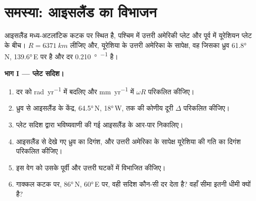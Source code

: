 \section{समस्या: आइसलैंड का विभाजन}

\begin{problem}
\label{pb:b1:plate-kinematics:1}
आइसलैंड मध्य-अटलांटिक कटक पर स्थित है, पश्चिम में उत्तरी अमेरिकी प्लेट और पूर्व में यूरेशियन प्लेट के बीच। $R = \qty{6371}{km}$ लीजिए और, यूरेशिया के उत्तरी अमेरिका के सापेक्ष, वह  जिसका ध्रुव \ang{61.8}\,N, \ang{139.6}\,E पर है और दर \qty{0.210}{\degree\per\Myr} है।

\medskip
\noindent\textbf{भाग I --- प्लेट सदिश।}
\begin{enumerate}
  \item दर को \unit{rad.yr^{-1}} में बदलिए और \unit{mm.yr^{-1}} में $\omega R$ परिकलित कीजिए।
  \item ध्रुव से आइसलैंड के केंद्र, \ang{64.5}\,N, \ang{18}\,W, तक की कोणीय दूरी $\Delta$ परिकलित कीजिए।
  \item प्लेट सदिश द्वारा भविष्यवाणी की गई आइसलैंड के आर-पार  निकालिए।
  \item आइसलैंड से देखे गए ध्रुव का दिगंश, और उत्तरी अमेरिका के सापेक्ष यूरेशिया की गति का दिगंश परिकलित कीजिए।
  \item इस वेग को उसके पूर्वी और उत्तरी घटकों में विभाजित कीजिए।
  \item गाक्कल कटक पर, \ang{86}\,N, \ang{60}\,E पर, वही सदिश कौन-सी दर देता है? वहाँ सीमा इतनी धीमी क्यों है?
\end{enumerate}


\end{problem}
